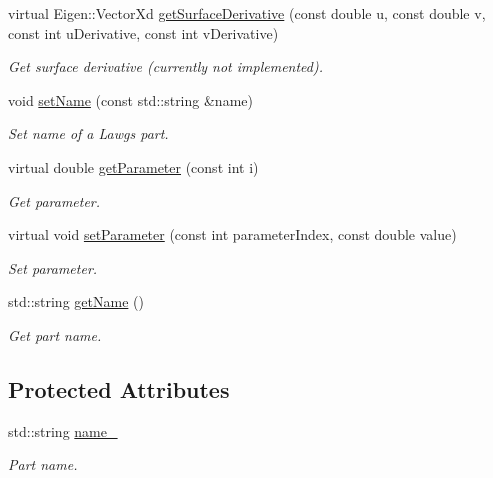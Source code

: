 \begin{DoxyCompactItemize}
virtual Eigen\+::\+Vector\+Xd \hyperlink{classtudat_1_1geometric__shapes_1_1LawgsPartGeometry_a1f1cb867a6612ee3bb9dffa30e4f5755}{get\+Surface\+Derivative} (const double u, const double v, const int u\+Derivative, const int v\+Derivative)
\begin{DoxyCompactList}\small\item\em Get surface derivative (currently not implemented). \end{DoxyCompactList}\item 
void \hyperlink{classtudat_1_1geometric__shapes_1_1LawgsPartGeometry_a2ef6186379526cc3bc090ee3225dd7bf}{set\+Name} (const std\+::string \&name)
\begin{DoxyCompactList}\small\item\em Set name of a Lawgs part. \end{DoxyCompactList}\item 
virtual double \hyperlink{classtudat_1_1geometric__shapes_1_1LawgsPartGeometry_af7846a5393045d590ba4d1fb58e30fb0}{get\+Parameter} (const int i)
\begin{DoxyCompactList}\small\item\em Get parameter. \end{DoxyCompactList}\item 
virtual void \hyperlink{classtudat_1_1geometric__shapes_1_1LawgsPartGeometry_ac10cdea82268f795ebd1f95e994317c4}{set\+Parameter} (const int parameter\+Index, const double value)
\begin{DoxyCompactList}\small\item\em Set parameter. \end{DoxyCompactList}\item 
std\+::string \hyperlink{classtudat_1_1geometric__shapes_1_1LawgsPartGeometry_ab5d086fe776b2e09918fa12e2ecf1d0f}{get\+Name} ()
\begin{DoxyCompactList}\small\item\em Get part name. \end{DoxyCompactList}\end{DoxyCompactItemize}
\subsection*{Protected Attributes}
\begin{DoxyCompactItemize}
\item 
std\+::string \hyperlink{classtudat_1_1geometric__shapes_1_1LawgsPartGeometry_a45a1463a81f989e428f955686ab986c9}{name\+\_\+}
\begin{DoxyCompactList}\small\item\em Part name. \end{DoxyCompactList}\end{DoxyCompactItemize}
